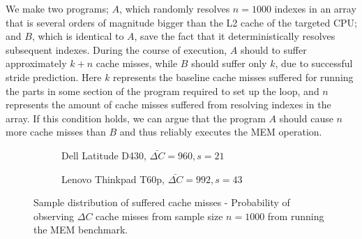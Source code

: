 We make two programs; \(A\), which randomly resolves \(n = 1000\) indexes in an array that is several orders of magnitude bigger than the L2 cache of the targeted CPU; and \(B\), which is identical to \(A\), save the fact that it deterministically resolves subsequent indexes.
During the course of execution, \(A\) should to suffer approximately \(k+n\) cache misses, while \(B\) should suffer only \(k\), due to successful stride prediction.
Here \(k\) represents the baseline cache misses suffered for running the parts in some section of the program required to set up the loop, and \(n\) represents the amount of cache misses suffered from resolving indexes in the array.
If this condition holds, we can argue that the program \(A\) should cause \(n\) more cache misses than \(B\) and thus reliably executes the MEM operation. 

\begin{figure}
    \begin{subfigure}{0.5\textwidth}
        \centering
        \caption{Dell Latitude D430, $\bar{\Delta C} = 960, s=21$ }
    \end{subfigure}
    \begin{subfigure}{0.5\textwidth}
        \centering
        \caption{Lenovo Thinkpad T60p, $\bar{\Delta C} = 992, s=43$ }
    \end{subfigure}
    \caption{Sample distribution of suffered cache misses - Probability of observing \(\Delta C\) cache misses from sample size $n=1000$ from running the MEM benchmark.}
    \label{fig:mem_benchmark}
\end{figure}

